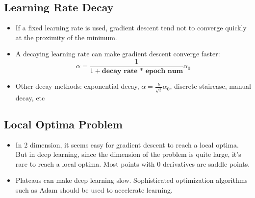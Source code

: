 \subsection{Learning Rate Decay}
\begin{itemize}
  \item If a fixed learning rate is used, gradient descent tend not to converge quickly at the proximity of the minimum.
  \item A decaying learning rate can make gradient descent converge faster:
  \[\alpha=\frac{1}{1+\textbf{decay rate * epoch num}}\alpha_0\]
  \item Other decay methods: exponential decay, $\alpha=\frac{k}{\sqrt{t}}\alpha_0$, discrete staircase, manual decay, etc
\end{itemize}
\subsection{Local Optima Problem}
\begin{itemize}
  \item In 2 dimension, it seems easy for gradient descent to reach a local optima. But in deep learning, since the dimension of the problem is quite large, it's rare to reach a local optima. Most points with 0 derivatives are saddle points.
  \item Plateaus can make deep learning slow. Sophisticated optimization algorithms such as Adam should be used to accelerate learning.
\end{itemize}
\ifx\PREAMBLE\undefined

\fi